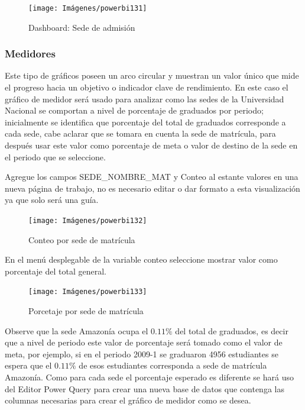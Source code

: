 \documentclass[
]{book}
\begin{document}
\begin{figure}

{\centering \texttt{[image: Imágenes/powerbi131]} 

}

\caption{Dashboard: Sede de admisión}\label{fig:tablerosededeadmision-fig}
\end{figure}

\hypertarget{medidores}{%
\subsubsection{Medidores}\label{medidores}}

Este tipo de gráficos poseen un arco circular y muestran un valor único que mide el progreso hacia un objetivo o indicador clave de rendimiento. En este caso el gráfico de medidor será usado para analizar como las sedes de la Universidad Nacional se comportan a nivel de porcentaje de graduados por periodo; inicialmente se identifica que porcentaje del total de graduados corresponde a cada sede, cabe aclarar que se tomara en cuenta la sede de matrícula, para después usar este valor como porcentaje de meta o valor de destino de la sede en el periodo que se seleccione.

Agregue los campos SEDE\_NOMBRE\_MAT y Conteo al estante valores en una nueva página de trabajo, no es necesario editar o dar formato a esta visualización ya que solo será una guía.

\begin{figure}

{\centering \texttt{[image: Imágenes/powerbi132]} 

}

\caption{Conteo por sede de matrícula}\label{fig:verconteiporsedematricula-fig}
\end{figure}

En el menú desplegable de la variable conteo seleccione mostrar valor como porcentaje del total general.

\begin{figure}

{\centering \texttt{[image: Imágenes/powerbi133]} 

}

\caption{Porcetaje por sede de matrícula}\label{fig:verporcentajeporsedematricula-fig}
\end{figure}

Observe que la sede Amazonía ocupa el \(0.11\%\) del total de graduados, es decir que a nivel de periodo este valor de porcentaje será tomado como el valor de meta, por ejemplo, si en el periodo 2009-1 se graduaron 4956 estudiantes se espera que el \(0.11\%\) de esos estudiantes corresponda a sede de matrícula Amazonía. Como para cada sede el porcentaje esperado es diferente se hará uso del Editor Power Query para crear una nueva base de datos que contenga las columnas necesarias para crear el gráfico de medidor como se desea.
\end{document}
